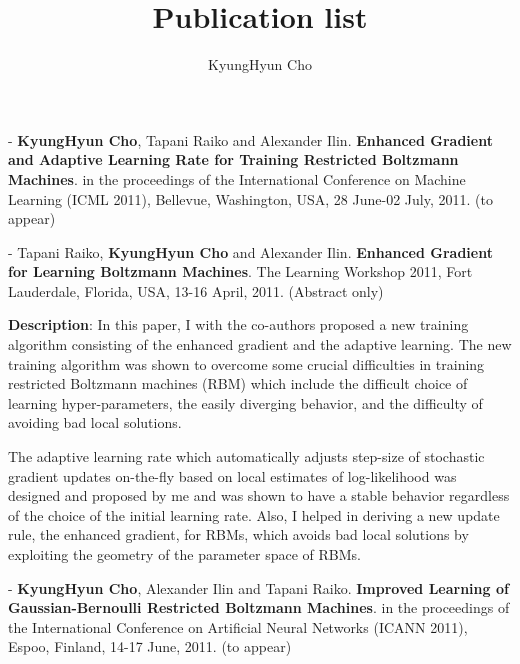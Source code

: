 \documentclass[11pt, oneside]{essay}
\title{Publication list}
\author{KyungHyun Cho}
\begin{document}
\maketitle

\vspace{5mm}

- \textbf{KyungHyun Cho}, Tapani Raiko and Alexander Ilin.
\textbf{Enhanced Gradient and Adaptive Learning Rate for Training
Restricted Boltzmann Machines}.
in the proceedings of the International Conference on
Machine Learning (ICML 2011), Bellevue, Washington, USA,
28 June-02 July, 2011. (to appear) 

- Tapani Raiko, \textbf{KyungHyun Cho} and Alexander Ilin.
\textbf{Enhanced Gradient for Learning Boltzmann Machines}.
The Learning Workshop 2011, Fort Lauderdale, Florida, USA, 13-16
April, 2011. (Abstract only)

\begin{center}
\begin{minipage}{0.93\textwidth}

\setlength{\parindent}{0pt}
\setlength{\parskip}{2ex plus 0.5ex minus 0.2ex}

\textbf{Description}:
In this paper, I with the co-authors proposed a
new training algorithm consisting of the enhanced gradient
and the adaptive learning. The new training algorithm was
shown to overcome some crucial difficulties in training
restricted Boltzmann machines (RBM) which include the
difficult choice of learning hyper-parameters, the
easily diverging behavior, and the difficulty of avoiding
bad local solutions. 

The adaptive learning rate which automatically adjusts
step-size of stochastic gradient updates on-the-fly based on
local estimates of log-likelihood was designed and proposed
by me and was shown to have a stable behavior regardless of
the choice of the initial learning rate. Also, I helped in
deriving a new update rule, the enhanced gradient, for RBMs,
which avoids bad local solutions by exploiting the
geometry of the parameter space of RBMs.

\end{minipage}
\end{center}

\vspace{5mm}

- \textbf{KyungHyun Cho}, Alexander Ilin and Tapani Raiko.
\textbf{Improved Learning of Gaussian-Bernoulli Restricted Boltzmann
Machines}.
in the proceedings of the International Conference on
Artificial Neural Networks (ICANN 2011), Espoo, Finland,
14-17 June, 2011. (to appear)
\end{document}
